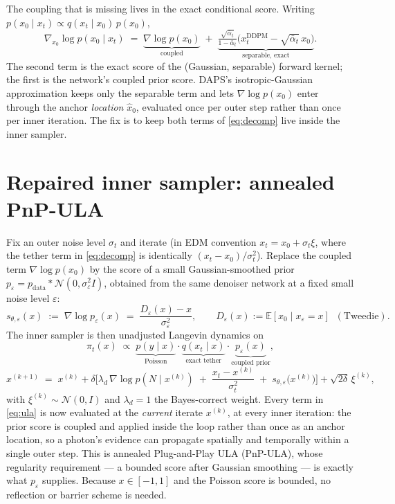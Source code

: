 \documentclass[11pt]{article}
\newcommand{\bxi}{\xi}
\newcommand{\E}{\mathbb{E}}
\begin{document}
The coupling that is missing lives in the exact conditional score. Writing $p(x_0\mid x_t)\propto q(x_t\mid x_0)\,p(x_0)$,
\begin{equation}
\nabla_{x_0}\log p(x_0\mid x_t) \;=\; \underbrace{\nabla\log p(x_0)}_{\text{coupled}} \;+\; \underbrace{\tfrac{\sqrt{\bar\alpha_t}}{1-\bar\alpha_t}\big(x_t^{\mathrm{DDPM}}-\sqrt{\bar\alpha_t}\,x_0\big)}_{\text{separable, exact}}. \label{eq:decomp}
\end{equation}
The second term is the exact score of the (Gaussian, separable) forward kernel; the first is the network's coupled prior score. DAPS's isotropic-Gaussian approximation keeps only the separable term and lets $\nabla\log p(x_0)$ enter through the anchor \emph{location} $\hat x_0$, evaluated once per outer step rather than once per inner iteration. The fix is to keep both terms of \eqref{eq:decomp} live inside the inner sampler.

\section{Repaired inner sampler: annealed PnP-ULA}

Fix an outer noise level $\sigma_t$ and iterate (in EDM convention $x_t = x_0+\sigma_t\bxi$, where the tether term in \eqref{eq:decomp} is identically $(x_t-x_0)/\sigma_t^2$). Replace the coupled term $\nabla\log p(x_0)$ by the score of a small Gaussian-smoothed prior $p_\varepsilon = p_{\mathrm{data}} * \mathcal N(0,\sigma_\varepsilon^2 I)$, obtained from the same denoiser network at a fixed small noise level $\varepsilon$:
\[
s_{\theta,\varepsilon}(x) \;:=\; \nabla\log p_\varepsilon(x) \;=\; \frac{D_\varepsilon(x)-x}{\sigma_\varepsilon^2}, \qquad D_\varepsilon(x) := \E[x_0\mid x_\varepsilon = x] \;\;(\text{Tweedie}).
\]
The inner sampler is then unadjusted Langevin dynamics on
\[
\pi_t(x) \;\propto\; \underbrace{p(y\mid x)}_{\text{Poisson}} \cdot \underbrace{q(x_t\mid x)}_{\text{exact tether}} \cdot \underbrace{p_\varepsilon(x)}_{\text{coupled prior}},
\]
\begin{equation}
x^{(k+1)} \;=\; x^{(k)} + \delta\Big[\lambda_d\,\nabla\log p(N\mid x^{(k)}) \;+\; \frac{x_t-x^{(k)}}{\sigma_t^2} \;+\; s_{\theta,\varepsilon}\big(x^{(k)}\big)\Big] + \sqrt{2\delta}\,\bxi^{(k)}, \label{eq:ula}
\end{equation}
with $\bxi^{(k)}\sim\mathcal N(0,I)$ and $\lambda_d=1$ the Bayes-correct weight. Every term in \eqref{eq:ula} is now evaluated at the \emph{current} iterate $x^{(k)}$, at every inner iteration: the prior score is coupled and applied inside the loop rather than once as an anchor location, so a photon's evidence can propagate spatially and temporally within a single outer step. This is annealed Plug-and-Play ULA (PnP-ULA), whose regularity requirement --- a bounded score after Gaussian smoothing --- is exactly what $p_\varepsilon$ supplies. Because $x\in[-1,1]$ and the Poisson score is bounded, no reflection or barrier scheme is needed.
\end{document}
